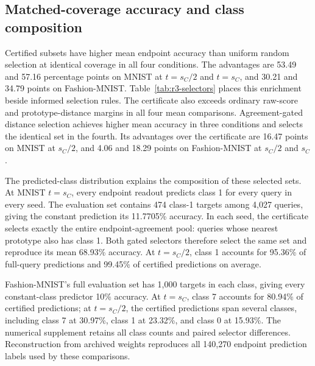 \subsection{Matched-coverage accuracy and class composition}
\label{sec:r3-selectors}
Certified subsets have higher mean endpoint accuracy than uniform random selection at identical coverage in all four conditions. The advantages are 53.49 and 57.16 percentage points on MNIST at $t=s_C/2$ and $t=s_C$, and 30.21 and 34.79 points on Fashion-MNIST. Table~\ref{tab:r3-selectors} places this enrichment beside informed selection rules. The certificate also exceeds ordinary raw-score and prototype-distance margins in all four mean comparisons. Agreement-gated distance selection achieves higher mean accuracy in three conditions and selects the identical set in the fourth. Its advantages over the certificate are 16.47 points on MNIST at $s_C/2$, and 4.06 and 18.29 points on Fashion-MNIST at $s_C/2$ and $s_C$.



The predicted-class distribution explains the composition of these selected sets. At MNIST $t=s_C$, every endpoint readout predicts class 1 for every query in every seed. The evaluation set contains 474 class-1 targets among 4,027 queries, giving the constant prediction its 11.7705\% accuracy. In each seed, the certificate selects exactly the entire endpoint-agreement pool: queries whose nearest prototype also has class 1. Both gated selectors therefore select the same set and reproduce its mean 68.93\% accuracy. At $t=s_C/2$, class 1 accounts for 95.36\% of full-query predictions and 99.45\% of certified predictions on average.

Fashion-MNIST's full evaluation set has 1,000 targets in each class, giving every constant-class predictor 10\% accuracy. At $t=s_C$, class 7 accounts for 80.94\% of certified predictions; at $t=s_C/2$, the certified predictions span several classes, including class 7 at 30.97\%, class 1 at 23.32\%, and class 0 at 15.93\%. The numerical supplement retains all class counts and paired selector differences. Reconstruction from archived weights reproduces all 140,270 endpoint prediction labels used by these comparisons.
